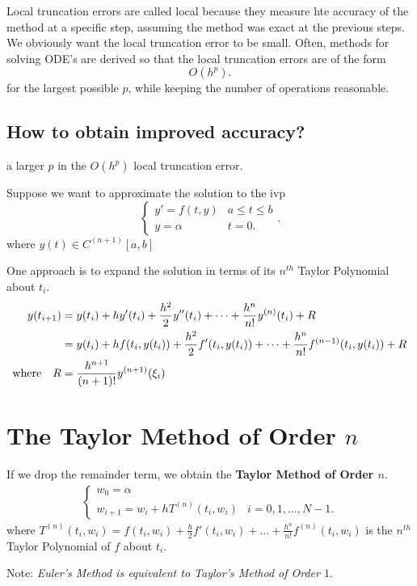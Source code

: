 Local truncation errors are called local because they measure hte accuracy of
the method at a specific step, assuming the method was exact at the previous
steps. We obviously want the local truncation error to be small. Often, methods
for solving ODE's are derived so that the local truncation errors are of the
form
\[
O(h^p)
.\]
for the largest possible $p$, while keeping the number of operations reasonable.

\subsection{How to obtain improved accuracy?}
\ie a larger $p$ in the $O(h^p)$ local truncation error.

Suppose we want to approximate the solution to the ivp 
\[
  \begin{cases}
    y' = f(t,y) & a \leq t \leq b\\
    y = \alpha & t = 0
  .\end{cases}
.\]
where $y(t) \in C^{(n+1)} [a,b]$

One approach is to expand the solution in terms of its $n^{th}$ Taylor
Polynomial about $t_i$.
\begin{align*}
	y(t_{i+1}) &= y(t_i) + h y'(t_i) + \frac{h^2}{2} y''(t_i) + \cdots + \frac{h^n}{n!} y^{(n)}(t_i) + R \\
		   &= y(t_i) + h f\pqty{t_i, y(t_i)} + \frac{h^2}{2} f'\pqty{t_i, y(t_i)} + \cdots + \frac{h^n}{n!} f^{(n-1)}\pqty{t_i, y(t_i)} + R \\
  \text{where} \quad R &= \frac{h^{n+1}}{(n+1)!} y^{(n+1)}\pqty{\xi_i}
\end{align*}

\section{The Taylor Method of Order $n$}
If we drop the remainder term, we obtain the \textbf{Taylor Method of Order $n$}.
\begin{align*}
  \begin{cases}
    w_0 = \alpha & \\
    w_{i+1} = w_i + hT^{(n)}(t_i, w_i) & i = 0, 1, \dots, N-1
  .\end{cases}
\end{align*}
where $T^{(n)}(t_i, w_i) = f(t_i, w_i) + \frac{h}{2}f'(t_i, w_i) + \dots + 
\frac{h^n}{n!}f^{(n)}(t_i, w_i)$ is the $n^{th}$ Taylor Polynomial of $f$ about
$t_i$.

Note: \textit{Euler's Method is equivalent to Taylor's Method of Order $1$}.

